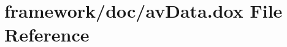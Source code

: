 \hypertarget{av_data_8dox}{}\section{framework/doc/av\+Data.dox File Reference}
\label{av_data_8dox}
